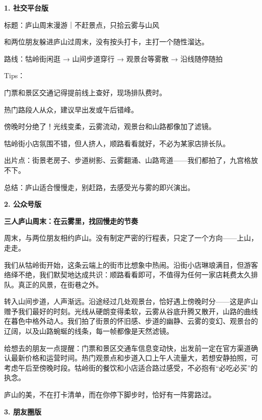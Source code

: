 \begin{aibox}
\textbf{1. 社交平台版}

标题：庐山周末漫游｜不赶景点，只拾云雾与山风

和两位朋友躲进庐山过周末，没有按头打卡，主打一个随性溜达。

路线：牯岭街闲逛 → 山间步道穿行 → 观景台等雾散 → 沿线随停随拍

Tips：

门票和景区交通记得提前线上查好，现场排队费时。

热门路段人从众，建议早出发或午后错峰。

傍晚时分绝了！光线变柔，云雾流动，观景台和山路都像加了滤镜。

牯岭街小店氛围不错，但人挤人，顺路看看就好，不必为某家店排长队。

出片点：街景老房子、步道树影、云雾翻涌、山路弯道——我们都拍了，九宫格放不下。

总结：庐山适合慢慢走，别赶路，去感受光与雾的即兴演出。

\textbf{2. 公众号版}

\begin{center}
\textbf{三人庐山周末：在云雾里，找回慢走的节奏}
\end{center}

\par\qquad 周末，与两位朋友相约庐山。没有制定严密的行程表，只定了一个方向——上山，走走。

\par\qquad 我们从牯岭街开始，这条云端上的街市比想象中热闹。沿街小店琳琅满目，但游客络绎不绝，我们默契地达成共识：顺路看看即可，不值得为任何一家店耗费太久排队。真正的风景，在街巷之外。

\par\qquad 转入山间步道，人声渐远。沿途经过几处观景台，恰好遇上傍晚时分——这是庐山赠予我们最好的时刻。光线从硬朗变得柔软，云雾从谷底升腾又散开，山路的曲线在暮色中格外动人。我们拍了街景的怀旧感、步道的幽静、云雾的变幻、观景台的辽阔，以及山路蜿蜒的线条，每一帧都像是天然滤镜。

\par\qquad 给想去的朋友一点提醒：门票和景区交通车信息变动快，出发前一定在官方渠道确认最新价格和运营时间。热门观景点和步道入口上午人流量大，若想安静拍照，可考虑午后至傍晚时段。牯岭街的餐饮和小店适合路过感受，不必抱有``必吃必买''的执念。

\par\qquad 庐山的美，不在打卡清单，而在你停下脚步时，恰好有一阵雾路过。

\textbf{3. 朋友圈版}


\end{aibox}
